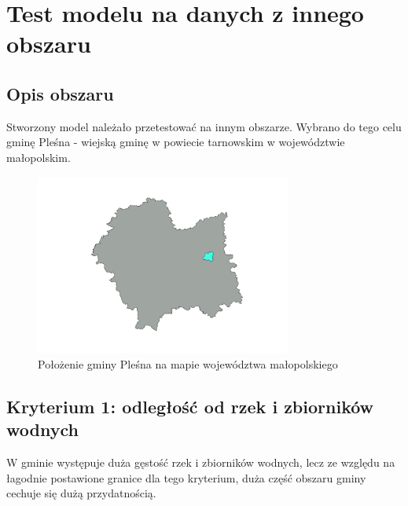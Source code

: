 \documentclass{article}
\begin{document}
\section{Test modelu na danych z innego obszaru}
\subsection{Opis obszaru}
Stworzony model należało przetestować na innym obszarze. Wybrano do tego celu gminę Pleśna - wiejską gminę w powiecie tarnowskim w województwie małopolskim.

\begin{figure}[H]
    \centering
    \includegraphics[width=0.75\textwidth]{img/plesna.png}
    \caption{Położenie gminy Pleśna na mapie województwa małopolskiego}
\end{figure}

\subsection{Kryterium 1: odległość od rzek i zbiorników wodnych}
W gminie występuje duża gęstość rzek i zbiorników wodnych, lecz ze względu na łagodnie postawione granice dla tego kryterium, duża część obszaru gminy cechuje się dużą przydatnością.
\end{document}
